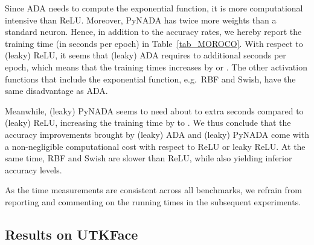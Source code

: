 \documentclass[pdflatex,sn-mathphys]{sn-jnl}
\theoremstyle{thmstyleone}
\theoremstyle{thmstyletwo}\newtheorem{example}{Example}\newtheorem{remark}{Remark}
\theoremstyle{thmstylethree}\newtheorem{definition}{Definition}\DeclareMathOperator{\sinc}{sinc}
\begin{document}
Since ADA needs to compute the exponential function, it is more computational intensive than ReLU. Moreover, PyNADA has twice more weights than a standard neuron. Hence, in addition to the accuracy rates, we hereby report the training time (in seconds per epoch) in Table~\ref{tab_MOROCO}. With respect to (leaky) ReLU, it seems that (leaky) ADA requires  to  additional seconds per epoch, which means that the training times increases by  or . The other activation functions that include the exponential function, e.g.~RBF and Swish, have the same disadvantage as ADA.

Meanwhile, (leaky) PyNADA seems to need about  to  extra seconds compared to (leaky) ReLU, increasing the training time by  to . We thus conclude that the accuracy improvements brought by (leaky) ADA and (leaky) PyNADA come with a non-negligible computational cost with respect to ReLU or leaky ReLU. At the same time, RBF and Swish are slower than ReLU, while also yielding inferior accuracy levels.

As the time measurements are consistent across all benchmarks, we refrain from reporting and commenting on the running times in the subsequent experiments.

\subsection{Results on UTKFace}
\label{sec_results_utk}
\end{document}
